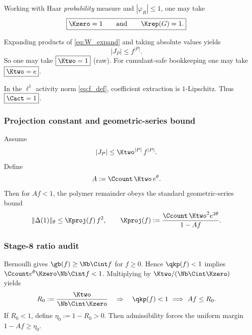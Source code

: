 \begin{lemma}\label{lem:K0_one}
Working with Haar \emph{probability} measure and $|\varphi_R|\le 1$, one may take
\[\boxed{\Kzero=1\qquad\text{and}\qquad \Krep(G)=1.}\]
\end{lemma}

\begin{lemma}\label{lem:K2_raw}
Expanding products of \eqref{eq:W_expand} and taking absolute values yields
\[
|J_P|\le f^{|P|}.
\]
So one may take $\boxed{\Ktwo=1}$ (raw).
For cumulant-safe bookkeeping one may take $\boxed{\Ktwo=e}$.
\end{lemma}

\begin{lemma}\label{lem:Cact_one}
In the $\ell^1$ activity norm \eqref{eq:f_def}, coefficient extraction is $1$-Lipschitz.
Thus $\boxed{\Cact=1}$.
\end{lemma}

\subsubsection{Projection constant and geometric-series bound}

Assume
\begin{equation}\label{eq:K2_assumption}
|J_P|\le \Ktwo^{|P|}\,f^{|P|}.
\end{equation}
Define
\begin{equation}\label{eq:A_def}
A:=\Ccount\,\Ktwo\,e^{\theta}.
\end{equation}
Then for $Af<1$, the polymer remainder obeys the standard geometric-series bound
\begin{equation}\label{eq:Kproj_def}
\|\Delta(1)\|_{\theta}\le \Kproj(f)\,f^2,
\qquad
\Kproj(f):=\frac{\Ccount\,\Ktwo^2 e^{2\theta}}{1-Af}.
\end{equation}

\subsubsection{Stage-8 ratio audit}

Bernoulli gives $\gb(f)\ge \Nb\Cint f$ for $f\ge 0$.
Hence $\qkp(f)<1$ implies $\Ccount e^{\theta}\Kzero\Nb\Cint f<1$.
Multiplying by $\Ktwo/(\Nb\Cint\Kzero)$ yields
\begin{equation}\label{eq:R0_def}
R_0:=\frac{\Ktwo}{\Nb\Cint\Kzero}
\quad\Rightarrow\quad
\qkp(f)<1\ \Longrightarrow\ Af\le R_0.
\end{equation}
If $R_0<1$, define $\eta_0:=1-R_0>0$.
Then admissibility forces the uniform margin $1-Af\ge \eta_0$.

